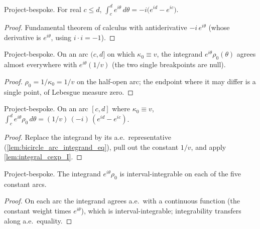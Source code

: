 \begin{lemma}

  \label{lem:integral_cexp_I}
  Project-bespoke. For real $c \le d$, $\int_c^d e^{i\theta}\,d\theta =
  -i\bigl(e^{id} - e^{ic}\bigr)$.
\end{lemma}
\begin{proof}

\leanok
  Fundamental theorem of calculus with antiderivative $-i\,e^{i\theta}$ (whose
  derivative is $e^{i\theta}$, using $i\cdot i = -1$).
\end{proof}

\begin{lemma}

  \label{lem:bicircle_arc_integrand_eq}
  Project-bespoke. On an arc $(c,d]$ on which $\kappa_0 \equiv v$, the integrand
  $e^{i\theta}\rho_0(\theta)$ agrees almost everywhere with $e^{i\theta}(1/v)$
  (the two single breakpoints are null).
\end{lemma}
\begin{proof}

\leanok
  $\rho_0 = 1/\kappa_0 = 1/v$ on the half-open arc; the endpoint where it may
  differ is a single point, of Lebesgue measure zero.
\end{proof}

\begin{lemma}

  \label{lem:bicircle_arc_integral}
  Project-bespoke. On an arc $[c,d]$ where $\kappa_0 \equiv v$,
  $\int_c^d e^{i\theta}\rho_0\,d\theta = (1/v)\,(-i)\,(e^{id}-e^{ic})$.
\end{lemma}
\begin{proof}

\leanok
  Replace the integrand by its a.e.\ representative
  (\cref{lem:bicircle_arc_integrand_eq}), pull out the constant $1/v$, and apply
  \cref{lem:integral_cexp_I}.
\end{proof}

\begin{lemma}

  \label{lem:bicircle_arc_integrable}
  Project-bespoke. The integrand $e^{i\theta}\rho_0$ is interval-integrable on
  each of the five constant arcs.
\end{lemma}
\begin{proof}

\leanok
  On each arc the integrand agrees a.e.\ with a continuous function (the constant
  weight times $e^{i\theta}$), which is interval-integrable; integrability
  transfers along a.e.\ equality.
\end{proof}

